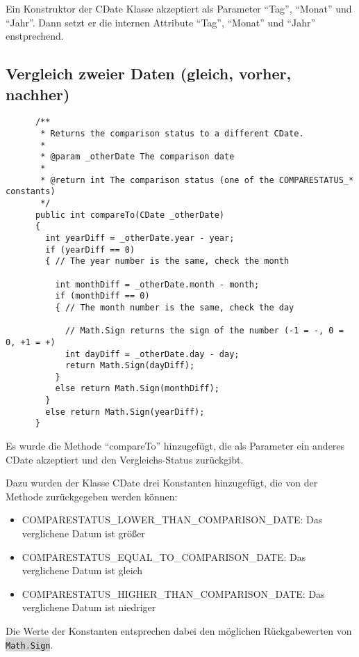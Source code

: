 \documentclass[12pt,pdftex,parskip=half]{scrartcl}
\newcommand{\inlinecode}[2]{\colorbox{lightgray}{\lstinline[language=#1]$#2$}}
\begin{document}
  Ein Konstruktor der CDate Klasse akzeptiert als Parameter "`Tag"', "`Monat"' und "`Jahr"'.
  Dann setzt er die internen Attribute "`Tag"', "`Monat"' und "`Jahr"' enstprechend.

  \clearpage


  \subsection{Vergleich zweier Daten (gleich, vorher, nachher)}

  \begin{lstlisting}
      /**
       * Returns the comparison status to a different CDate.
       *
       * @param _otherDate The comparison date
       *
       * @return int The comparison status (one of the COMPARESTATUS_* constants)
       */
      public int compareTo(CDate _otherDate)
      {
        int yearDiff = _otherDate.year - year;
        if (yearDiff == 0)
        { // The year number is the same, check the month

          int monthDiff = _otherDate.month - month;
          if (monthDiff == 0)
          { // The month number is the same, check the day

            // Math.Sign returns the sign of the number (-1 = -, 0 = 0, +1 = +)
            int dayDiff = _otherDate.day - day;
            return Math.Sign(dayDiff);
          }
          else return Math.Sign(monthDiff);
        }
        else return Math.Sign(yearDiff);
      }
  \end{lstlisting}


  Es wurde die Methode "`compareTo"' hinzugefügt, die als Parameter ein anderes CDate akzeptiert und den Vergleichs-Status zurückgibt.

  Dazu wurden der Klasse CDate drei Konstanten hinzugefügt, die von der Methode zurückgegeben werden können:
    \begin{itemize}
      \item COMPARESTATUS\_LOWER\_THAN\_COMPARISON\_DATE: Das verglichene Datum ist größer
      \item COMPARESTATUS\_EQUAL\_TO\_COMPARISON\_DATE: Das verglichene Datum ist gleich
      \item COMPARESTATUS\_HIGHER\_THAN\_COMPARISON\_DATE: Das verglichene Datum ist niedriger
    \end{itemize}

    Die Werte der Konstanten entsprechen dabei den möglichen Rückgabewerten von \inlinecode{C}{Math.Sign}.
\end{document}
